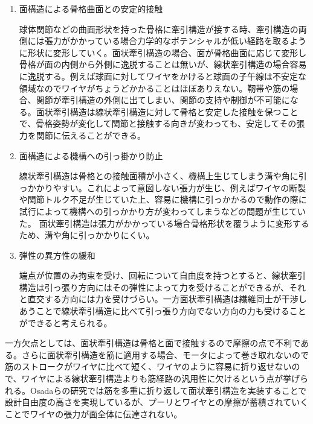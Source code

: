 \documentclass{jarticle}
\begin{document}
\begin{enumerate}
\item 面構造による骨格曲面との安定的接触

  球体関節などの曲面形状を持った骨格に牽引構造が接する時、牽引構造の両側には張力がかかっている場合力学的なポテンシャルが低い経路を取るように形状に変形していく。面状牽引構造の場合、面が骨格曲面に応じて変形し骨格が面の内側から外側に逸脱することは無いが、線状牽引構造の場合容易に逸脱する。例えば球面に対してワイヤをかけると球面の子午線は不安定な領域なのでワイヤがちょうどかかることはほぼありえない。靭帯や筋の場合、関節が牽引構造の外側に出てしまい、関節の支持や制御が不可能になる\cite{Humanoids2011:osada:planar}。面状牽引構造は線状牽引構造に対して骨格と安定した接触を保つことで、骨格姿勢が変化して関節と接触する向きが変わっても、安定してその張力を関節に伝えることができる。

\item 面構造による機構への引っ掛かり防止

  線状牽引構造は骨格との接触面積が小さく、機構上生じてしまう溝や角に引っかかりやすい。これによって意図しない張力が生じ、例えばワイヤの断裂や関節トルク不足が生じていた上、容易に機構に引っかかるので動作の際に試行によって機構への引っかかり方が変わってしまうなどの問題が生じていた。
  面状牽引構造は張力がかかっている場合骨格形状を覆うように変形するため、溝や角に引っかかりにくい。

\item 弾性の異方性の緩和

  端点が位置のみ拘束を受け、回転について自由度を持つとすると、線状牽引構造は引っ張り方向にはその弾性によって力を受けることができるが、それと直交する方向には力を受けづらい。一方面状牽引構造は繊維同士が干渉しあうことで線状牽引構造に比べて引っ張り方向でない方向の力も受けることができると考えられる。

\end{enumerate}

一方欠点としては、面状牽引構造は骨格と面で接触するので摩擦の点で不利である。さらに面状牽引構造を筋に適用する場合、モータによって巻き取れないので筋のストロークがワイヤに比べて短く、ワイヤのように容易に折り返せないので、ワイヤによる線状牽引構造よりも筋経路の汎用性に欠けるという点が挙げられる。Osadaらの研究\cite{Humanoids2011:osada:planar}では筋を多重に折り返して面状牽引構造を実装することで設計自由度の高さを実現しているが、プーリとワイヤとの摩擦が蓄積されていくことでワイヤの張力が面全体に伝達されない。
\end{document}
